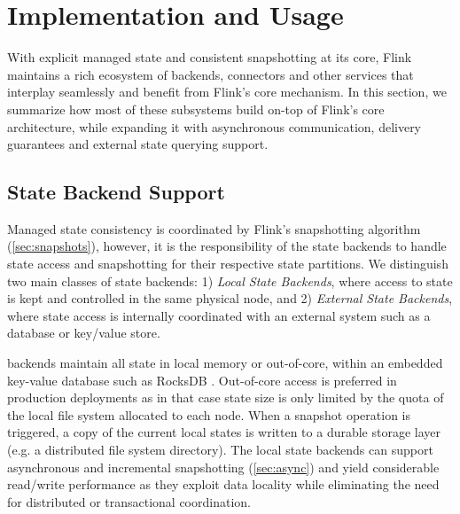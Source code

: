 

\section{Implementation and Usage}

With explicit managed state and consistent snapshotting at its core, Flink maintains a rich ecosystem of backends, connectors and other services that interplay seamlessly and benefit from Flink's core mechanism. In this section, we summarize how most of these subsystems build on-top of Flink's core architecture, while expanding it with asynchronous communication, delivery guarantees and external state querying support.

\label{sec:implementation}

\subsection{State Backend Support}

Managed state consistency is coordinated by Flink's snapshotting algorithm (\autoref{sec:snapshots}), however, it is the responsibility of the state backends to handle state access and snapshotting for their respective state partitions. We distinguish two main classes of state backends: 1) \emph{Local State Backends}, where access to state is kept and controlled in the same physical node, and 2) \emph{External State Backends}, where state access is internally coordinated with an external system such as a database or key/value store.

 backends maintain all state in local memory or out-of-core, within an embedded key-value database such as RocksDB \cite{CUSTOM:web/rocksdb}. Out-of-core access is preferred in production deployments as in that case state size is only limited by the quota of the local file system allocated to each node. When a snapshot operation is triggered, a copy of the current local states is written to a durable storage layer (e.g. a distributed file system directory). The local state backends can support asynchronous and incremental snapshotting (\autoref{sec:async}) and yield considerable read/write performance as they exploit data locality while eliminating the need for distributed or transactional coordination.

